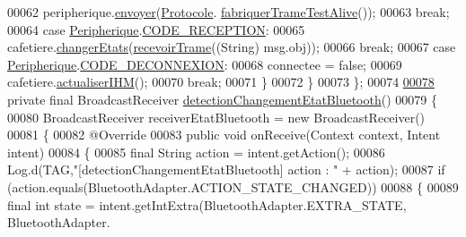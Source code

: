 \begin{DoxyCode}
00062                     peripherique.\hyperlink{classcom_1_1example_1_1ekawa_1_1_peripherique_ac1361bc1a445b00c4c7ebb56dfee274d}{envoyer}(\hyperlink{classcom_1_1example_1_1ekawa_1_1_protocole}{Protocole}.
      \hyperlink{classcom_1_1example_1_1ekawa_1_1_protocole_a6a93842b8987e56582d83c778305840a}{fabriquerTrameTestAlive}());
00063                     \textcolor{keywordflow}{break};
00064                 \textcolor{keywordflow}{case} \hyperlink{classcom_1_1example_1_1ekawa_1_1_peripherique}{Peripherique}.\hyperlink{classcom_1_1example_1_1ekawa_1_1_peripherique_a532f5da1747b68217b8764db9b85e845}{CODE\_RECEPTION}:
00065                     cafetiere.\hyperlink{classcom_1_1example_1_1ekawa_1_1_cafetiere_aba42bba06ffbf08735d7f548bcce9f42}{changerEtats}(\hyperlink{classcom_1_1example_1_1ekawa_1_1_communication_a0ca98776b3fe48fa76e134607edb7871}{recevoirTrame}((String) msg.obj));
00066                     \textcolor{keywordflow}{break};
00067                 \textcolor{keywordflow}{case} \hyperlink{classcom_1_1example_1_1ekawa_1_1_peripherique}{Peripherique}.\hyperlink{classcom_1_1example_1_1ekawa_1_1_peripherique_a99f0e30a113d64b30598c6305657dcee}{CODE\_DECONNEXION}:
00068                     connectee = \textcolor{keyword}{false};
00069                     cafetiere.\hyperlink{classcom_1_1example_1_1ekawa_1_1_cafetiere_ad8c8b7d410315f55a216de809571fd87}{actualiserIHM}();
00070                     \textcolor{keywordflow}{break};
00071             \}
00072         \}
00073     \};
00074 
\hyperlink{classcom_1_1example_1_1ekawa_1_1_communication_a7fb7acee2a343c884103481715ab4e65}{00078}     \textcolor{keyword}{private} \textcolor{keyword}{final} BroadcastReceiver \hyperlink{classcom_1_1example_1_1ekawa_1_1_communication_a7fb7acee2a343c884103481715ab4e65}{detectionChangementEtatBluetooth}()
00079     \{
00080         BroadcastReceiver receiverEtatBluetooth = \textcolor{keyword}{new} BroadcastReceiver()
00081         \{
00082             @Override
00083             \textcolor{keyword}{public} \textcolor{keywordtype}{void} onReceive(Context context, Intent intent)
00084             \{
00085                 \textcolor{keyword}{final} String action = intent.getAction();
00086                 Log.d(TAG,\textcolor{stringliteral}{"[detectionChangementEtatBluetooth] action : "} + action);
00087                 \textcolor{keywordflow}{if} (action.equals(BluetoothAdapter.ACTION\_STATE\_CHANGED))
00088                 \{
00089                     \textcolor{keyword}{final} \textcolor{keywordtype}{int} state = intent.getIntExtra(BluetoothAdapter.EXTRA\_STATE, BluetoothAdapter.

\end{DoxyCode}
